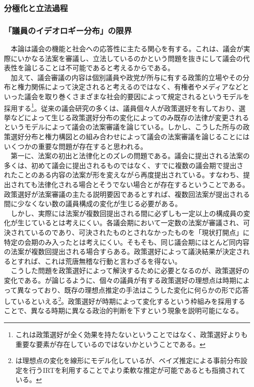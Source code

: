 \subsubsection{分極化と立法過程}
\subsubsection{「議員のイデオロギー分布」の限界}
　本論は議会の機能と社会への応答性に主たる関心を有する。これは、議会が実際にいかなる法案を審議し、立法しているのかという問題を抜きにして議会の代表性を論じることは不可能であると考えるからである。\\
　加えて、議会審議の内容は個別議員や政党が所与に有する政策的立場やその分布と権力関係によって決定されると考えるのではなく、有権者やメディアなどといった議会を取り巻くさまざまな社会的要因によって規定されるというモデルを採用する\footnote{これは政策選好が全く効果を持たないということではなく、政策選好よりも重要な要素が存在しているのではないかということである。}。従来の議会研究の多くは、議員個々人が政策選好を有しており、選挙などによって生じる政策選好分布の変化によってのみ既存の法律が変更されるというモデルによって議会の法案審議を論じている。\citep*{Poole2017-ir,Krehbiel1998-ob,Cox2005-pn,Cox2007-xq,Aldrich1995-xf}しかし、こうした所与の政策選好分布と権力構図との組み合わせによって議会の法案審議を論じることにはいくつかの重要な問題が存在すると思われる。\\
　第一に、法案の初出と法律化とのズレの問題である。議会に提出される法案の多くは、初めて議会に提出されるものではなく、すでに複数の議会期で提出されたことのある内容の法案が形を変えながら再度提出されている。すなわち、提出されても法律化される場合とそうでない場合とが存在するということである。政策選好が法案審議の主たる説明要因であるとすれば、複数回法案が提出される間に少なくない数の議員構成の変化が生じる必要がある。\\
　しかし、実際には法案が複数回提出される間に必ずしも一定以上の構成員の変化が生じているとは考えにくい。各議会期において一定数の法案が審議され、可決されているのであり、可決されたものとされなかったものを「現状打開点」\citep*{Tsebelis2009-hf}に特定の会期のみ入ったとは考えにくい。そもそも、同じ議会期にほとんど同内容の法案が複数回提出される場合すらある。政策選好によって議決結果が決定されるとすれば、これは荒唐無稽な行動と言わざるを得ない。\\
　こうした問題を政策選好によって解決するために必要となるのが、政策選好の変化である。\citet*{Poole2017-ir}が論じるように、個々の議員が有する政策選好の理想点は時期によって異なっており、既存の理想点推定の手法はこうした変化に何らかの形で応答しているといえる\footnote{\citet*{Poole2017-ir}は理想点の変化を線形にモデル化しているが、ベイズ推定による事前分布設定を行うIRTを利用することでより柔軟な推定が可能であるとも指摘されている。\citep*{Caughey2016-ef}}。政策選好が時期によって変化するという枠組みを採用することで、異なる時期に異なる政治的判断を下すという現象を説明可能になる。\\
